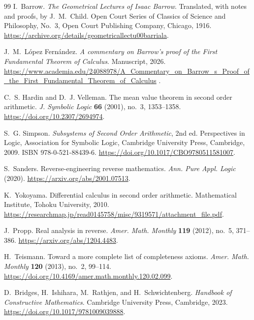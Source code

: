 \documentclass[11pt,reqno]{amsart}
\theoremstyle{redplain}
\begin{document}
\begin{thebibliography}{99}
 I.~Barrow. \newblock \emph{The Geometrical Lectures of
Isaac Barrow}. \newblock Translated, with notes and proofs, by J.~M.~Child.
Open Court Series of Classics of Science and Philosophy, No.~3, Open Court
Publishing Company, Chicago, 1916. \newblock %
\url{https://archive.org/details/geometricallectu00barriala}.

 J.~M.~L\'opez Fern\'andez. \newblock \emph{A commentary
on Barrow's proof of the First Fundamental Theorem of Calculus}. \newblock %
Manuscript, 2026. \newblock
\url{https://www.academia.edu/24088978/A_Commentary_on_Barrow_s_Proof_of_the_First_Fundamental_Theorem_of_Calculus}%
.

 C.~S. Hardin and D.~J. Velleman. \newblock The
mean value theorem in second order arithmetic. \newblock \emph{J. Symbolic
Logic} \textbf{66} (2001), no.~3, 1353--1358. \newblock %
\url{https://doi.org/10.2307/2694974}.

 S.~G. Simpson. \newblock \emph{Subsystems of Second
Order Arithmetic}, 2nd ed. \newblock Perspectives in Logic, Association for
Symbolic Logic, Cambridge University Press, Cambridge, 2009. \newblock ISBN
978-0-521-88439-6. \newblock \url{https://doi.org/10.1017/CBO9780511581007}.

 S.~Sanders. \newblock Reverse-engineering reverse
mathematics. \newblock \emph{Ann. Pure Appl. Logic} (2020). \newblock %
\url{https://arxiv.org/abs/2001.07513}.

 K.~Yokoyama. \newblock Differential calculus in
second order arithmetic. \newblock Mathematical Institute, Tohoku
University, 2010. \newblock
\url{https://researchmap.jp/read0145758/misc/9319571/attachment_file.pdf}.

 J.~Propp. \newblock Real analysis in reverse. \newblock 
\emph{Amer. Math. Monthly} \textbf{119} (2012), no.~5, 371--386. \newblock %
\url{https://arxiv.org/abs/1204.4483}.

 H.~Teismann. \newblock Toward a more complete list of
completeness axioms. \newblock \emph{Amer. Math. Monthly} \textbf{120}
(2013), no.~2, 99--114. \newblock %
\url{https://doi.org/10.4169/amer.math.monthly.120.02.099}.

 D.~Bridges, H.~Ishihara, M.~Rathjen, and
H.~Schwichtenberg. \newblock \emph{Handbook of Constructive Mathematics}. %
\newblock Cambridge University Press, Cambridge, 2023. \newblock %
\url{https://doi.org/10.1017/9781009039888}.


\end{thebibliography}
\end{document}
